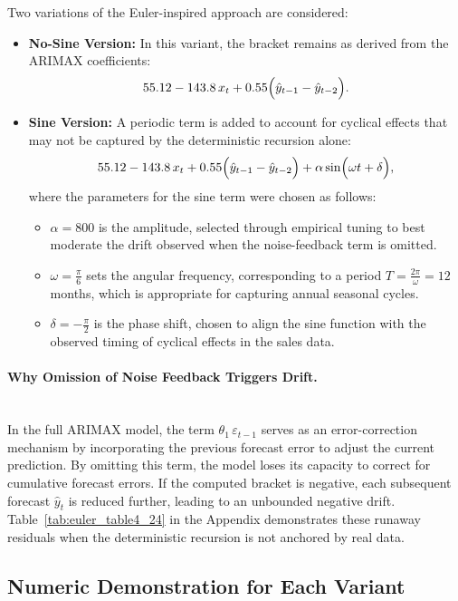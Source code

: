 \documentclass{article}
\begin{document}
Two variations of the Euler-inspired approach are considered:
\begin{itemize}
    \item \textbf{No-Sine Version:} In this variant, the bracket remains as derived from the ARIMAX coefficients:
    \[
    55.12 - 143.8\,x_t + 0.55\Bigl(\hat{y}_{t-1} - \hat{y}_{t-2}\Bigr).
    \]
    \item \textbf{Sine Version:} A periodic term is added to account for cyclical effects that may not be captured by the deterministic recursion alone:
    \[
    55.12 - 143.8\,x_t + 0.55\Bigl(\hat{y}_{t-1} - \hat{y}_{t-2}\Bigr) + \alpha\sin\Bigl(\omega t + \delta\Bigr),
    \]
    where the parameters for the sine term were chosen as follows:
    \begin{itemize}
        \item \(\alpha = 800\) is the amplitude, selected through empirical tuning to best moderate the drift observed when the noise-feedback term is omitted.
        \item \(\omega = \frac{\pi}{6}\) sets the angular frequency, corresponding to a period \(T = \frac{2\pi}{\omega} = 12\) months, which is appropriate for capturing annual seasonal cycles.
        \item \(\delta = -\frac{\pi}{2}\) is the phase shift, chosen to align the sine function with the observed timing of cyclical effects in the sales data.
    \end{itemize}
\end{itemize}

\paragraph{Why Omission of Noise Feedback Triggers Drift.}\\
In the full ARIMAX model, the term \(\theta_1\,\varepsilon_{t-1}\) serves as an error-correction mechanism by incorporating the previous forecast error to adjust the current prediction. By omitting this term, the model loses its capacity to correct for cumulative forecast errors. If the computed bracket is negative, each subsequent forecast \(\hat{y}_t\) is reduced further, leading to an unbounded negative drift. Table~\ref{tab:euler_table4_24} in the Appendix demonstrates these runaway residuals when the deterministic recursion is not anchored by real data.

\subsection{Numeric Demonstration for Each Variant}
\end{document}

